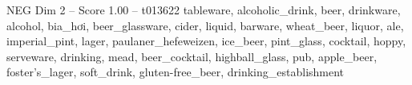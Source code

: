 \begin{textsample}{NEG Dim 2 – Score 1.00 – t013622}  \label{ex:f2_neg_013}
tableware, alcoholic\_drink, beer, drinkware, alcohol, bia\_hơi, beer\_glassware, cider, liquid, barware, wheat\_beer, liquor, ale, imperial\_pint, lager, paulaner\_hefeweizen, ice\_beer, pint\_glass, cocktail, hoppy, serveware, drinking, mead, beer\_cocktail, highball\_glass, pub, apple\_beer, foster's\_lager, soft\_drink, gluten-free\_beer, drinking\_establishment

\end{textsample}
